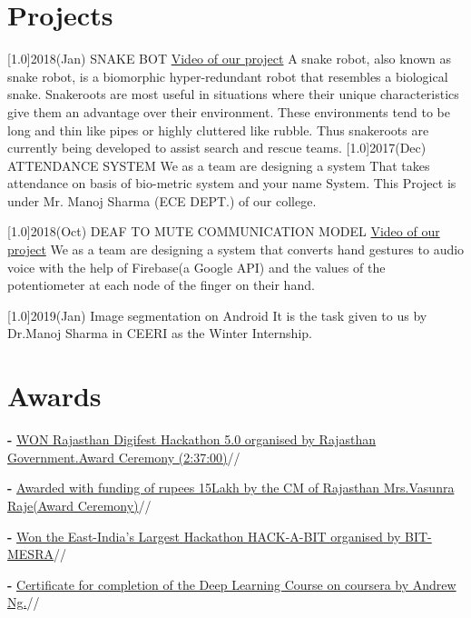 \documentclass[espanol]{cv-style}     %
\begin{document}
\section{Projects}
  \vspace{-0.2cm}
\begin{entrylist}
\entry
{\scalebox{.8}[1.0]{2018(Jan)}}
{SNAKE BOT}
{\href{https://www.youtube.com/watch?v=288WwUiQuMc&t=5s}{Video of our project}}
{A snake robot, also known as snake robot, is a biomorphic
hyper-redundant robot that resembles a biological snake.
Snakeroots are most useful in situations where their unique characteristics give them
an advantage over their environment. These environments tend to be long and thin
like pipes or highly cluttered like rubble. Thus snakeroots are currently being
developed to assist search and rescue teams.}
\entry
{\scalebox{.8}[1.0]{2017(Dec)}}
{ATTENDANCE SYSTEM}
{           }
{We as a team are designing a system That
takes attendance on basis of bio-metric system and your name System. This
Project is under Mr. Manoj Sharma (ECE DEPT.) of
our college.}

\entry
{\scalebox{.8}[1.0]{2018(Oct)}}
{DEAF TO MUTE COMMUNICATION MODEL}
{\href{https://drive.google.com/open?id=1_bYviurdXB6xN-S8j15YnuRMcF-p-heS}{Video of our project}}
{We as a team are designing a system that
converts hand gestures to audio voice with the help of Firebase(a Google API) and the values of the potentiometer at each node of the finger on their hand.}

\entry
{\scalebox{.8}[1.0]{2019(Jan)}}
{Image segmentation on Android}
{}
{It is the task given to us by Dr.Manoj Sharma in CEERI as the Winter Internship.}

\end{entrylist}
  \vspace{-0.2cm}
\section{Awards}
  \vspace{-0.2cm}
\textbf{-}  {\href{https://www.youtube.com/watch?v=rrQgRlSMAI8&t=9536s}{WON Rajasthan Digifest Hackathon 5.0 organised by Rajasthan Government.Award Ceremony (2:37:00)}}//

\textbf{-}  {\href{https://twitter.com/DIPRRajasthan/status/1022771192904601601/photo/1}{Awarded with funding of rupees 15Lakh by the CM of Rajasthan Mrs.Vasunra Raje(Award Ceremony)}}//

\textbf{-}  {\href{https://www.facebook.com/pg/hackabit/posts/}{Won the East-India's Largest Hackathon HACK-A-BIT organised by BIT-MESRA}}//

\textbf{-}
 {\href{https://www.coursera.org/account/accomplishments/certificate/E4KL4KCYWS2K}{Certificate for completion of the Deep Learning Course on coursera by Andrew Ng.}}//

\end{document}

